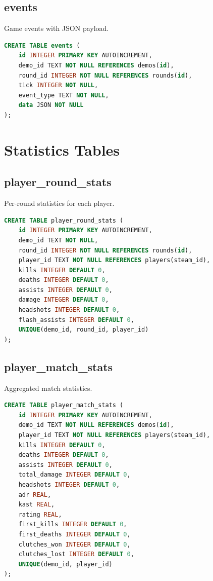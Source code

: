 \subsection{events}

Game events with JSON payload.

\begin{lstlisting}[language=SQL]
CREATE TABLE events (
    id INTEGER PRIMARY KEY AUTOINCREMENT,
    demo_id TEXT NOT NULL REFERENCES demos(id),
    round_id INTEGER NOT NULL REFERENCES rounds(id),
    tick INTEGER NOT NULL,
    event_type TEXT NOT NULL,
    data JSON NOT NULL
);
\end{lstlisting}

\section{Statistics Tables}

\subsection{player\_round\_stats}

Per-round statistics for each player.

\begin{lstlisting}[language=SQL]
CREATE TABLE player_round_stats (
    id INTEGER PRIMARY KEY AUTOINCREMENT,
    demo_id TEXT NOT NULL,
    round_id INTEGER NOT NULL REFERENCES rounds(id),
    player_id TEXT NOT NULL REFERENCES players(steam_id),
    kills INTEGER DEFAULT 0,
    deaths INTEGER DEFAULT 0,
    assists INTEGER DEFAULT 0,
    damage INTEGER DEFAULT 0,
    headshots INTEGER DEFAULT 0,
    flash_assists INTEGER DEFAULT 0,
    UNIQUE(demo_id, round_id, player_id)
);
\end{lstlisting}

\subsection{player\_match\_stats}

Aggregated match statistics.

\begin{lstlisting}[language=SQL]
CREATE TABLE player_match_stats (
    id INTEGER PRIMARY KEY AUTOINCREMENT,
    demo_id TEXT NOT NULL REFERENCES demos(id),
    player_id TEXT NOT NULL REFERENCES players(steam_id),
    kills INTEGER DEFAULT 0,
    deaths INTEGER DEFAULT 0,
    assists INTEGER DEFAULT 0,
    total_damage INTEGER DEFAULT 0,
    headshots INTEGER DEFAULT 0,
    adr REAL,
    kast REAL,
    rating REAL,
    first_kills INTEGER DEFAULT 0,
    first_deaths INTEGER DEFAULT 0,
    clutches_won INTEGER DEFAULT 0,
    clutches_lost INTEGER DEFAULT 0,
    UNIQUE(demo_id, player_id)
);
\end{lstlisting}

